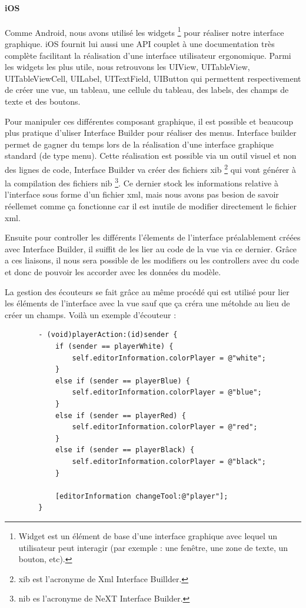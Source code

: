 		
		
		
		
		
	\paragraph{iOS\\}
		
		Comme Android, nous avons utilisé les widgets \footnote{Widget est un élément de base d'une interface graphique  avec lequel un utilisateur peut interagir  (par exemple : une fenêtre, une zone de texte, un bouton, etc).} pour réaliser notre interface graphique. iOS fournit lui aussi une API couplet à une documentation très complète facilitant la réalisation d'une interface utilisateur ergonomique. Parmi les widgets les plus utile, nous retrouvons les UIView, UITableView, UITableViewCell, UILabel, UITextField, UIButton qui permettent respectivement de créer une vue, un tableau, une cellule du tableau, des labels, des champs de texte et des boutons.
	
	Pour manipuler ces différentes composant graphique, il est possible et beaucoup plus pratique d'uliser Interface Builder pour réaliser des menus. Interface builder permet de gagner du temps lors de la réalisation d'une interface graphique standard (de type menu). Cette réalisation est possible via un outil visuel et non des lignes de code,  Interface Builder va créer des fichiers xib \footnote{xib est l'acronyme de Xml Interface Buillder.} qui vont générer à la compilation des fichiers nib \footnote{nib es l'acronyme de NeXT Interface Builder.}. Ce dernier stock les informations relative à l'interface sous forme d'un fichier xml, mais nous avons pas besion de savoir réellemet comme ça fonctionne car il est inutile de modifier directement le fichier xml.
	
	Ensuite pour controller les différents l'élements de l'interface préalablement créées avec Interface Builder, il suiffit de les lier au code de la vue via ce dernier. Grâce a ces liaisons, il nous sera possible de les modifiers ou les controllers avec du code et donc de pouvoir les accorder avec les données du modèle.
	
	La gestion des écouteurs se fait grâce au même procédé qui est utilisé pour lier les éléments de l'interface avec la vue sauf que ça créra une métohde au lieu de créer un champs. Voilà un exemple d'écouteur :
	
	\begin{verbatim}
		- (void)playerAction:(id)sender {
		    if (sender == playerWhite) {
		        self.editorInformation.colorPlayer = @"white";
		    }
		    else if (sender == playerBlue) {
		        self.editorInformation.colorPlayer = @"blue";
		    }
		    else if (sender == playerRed) {
		        self.editorInformation.colorPlayer = @"red";
		    }
		    else if (sender == playerBlack) {
		        self.editorInformation.colorPlayer = @"black";
		    }
    
		    [editorInformation changeTool:@"player"];
		}
	\end{verbatim}
	

